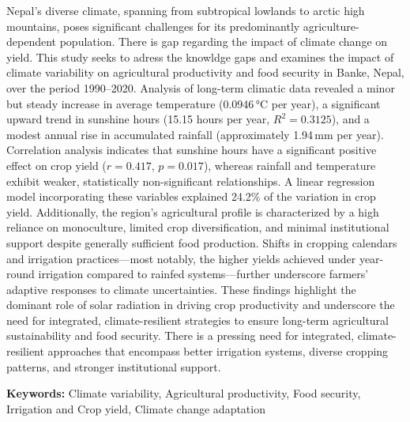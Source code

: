 

Nepal's diverse climate, spanning from subtropical lowlands to arctic high mountains, poses significant challenges for its predominantly agriculture-dependent population. There is gap regarding the impact of climate change on yield.  This study seeks to adress the knowldge gaps and examines the impact of climate variability on agricultural productivity and food security in Banke, Nepal, over the period 1990--2020. Analysis of long-term climatic data revealed a minor but steady increase in average temperature (0.0946\,°C per year), a significant upward trend in sunshine hours (15.15 hours per year, $R^2 = 0.3125$), and a modest annual rise in accumulated rainfall (approximately 1.94\,mm per year). Correlation analysis indicates that sunshine hours have a significant positive effect on crop yield ($r = 0.417$, $p = 0.017$), whereas rainfall and temperature exhibit weaker, statistically non-significant relationships. A linear regression model incorporating these variables explained 24.2\% of the variation in crop yield. Additionally, the region’s agricultural profile is characterized by a high reliance on monoculture, limited crop diversification, and minimal institutional support despite generally sufficient food production. Shifts in cropping calendars and irrigation practices—most notably, the higher yields achieved under year-round irrigation compared to rainfed systems—further underscore farmers' adaptive responses to climate uncertainties. These findings highlight the dominant role of solar radiation in driving crop productivity and underscore the need for integrated, climate-resilient strategies to ensure long-term agricultural sustainability and food security. There is a pressing need for integrated, climate-resilient approaches that encompass better irrigation systems, diverse cropping patterns, and stronger institutional support.




\noindent \textbf{Keywords:} Climate variability, Agricultural productivity, Food security, Irrigation and Crop yield, Climate change adaptation

